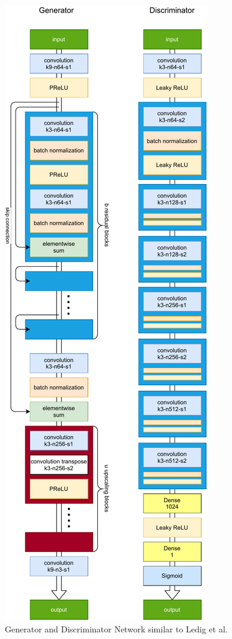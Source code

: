 \documentclass[11pt,twocolumn,twoside,paper=a4]{IEEEtran}
\begin{document}
\begin{center}
\begin{figure}[h]
        \includegraphics[scale=0.7]{../images/gen_and_dis.pdf}  
        \caption{Generator and Discriminator Network similar to Ledig et al.~\cite{DBLP:journals/corr/LedigTHCATTWS16} }   
        \label{fig:network_architecture}
    \end{figure} 
\end{center}
\end{document}
